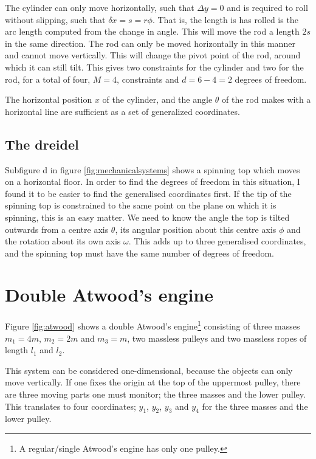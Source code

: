 \documentclass[11pt]{amsart}
\newcommand{\nocontentsline}[3]{}
\newcommand{\tocless}[2]{\bgroup\let\addcontentsline=\nocontentsline#1{#2}\egroup}
\begin{document}
The cylinder can only move horizontally, such that $\Delta y=0$ and is required to roll without slipping, such that $\delta x = s = r\phi$. That is, the length is has rolled is the arc length computed from the change in angle. This will move the rod a length $2s$ in the same direction. The rod can only be moved horizontally in this manner and cannot move vertically. This will change the pivot point of the rod, around which it can still tilt. This gives two constraints for the cylinder and two for the rod, for a total of four, $M=4$, constraints and $d = 6-4=2$ degrees of freedom.

The horizontal position $x$ of the cylinder, and the angle $\theta$ of the rod makes with a horizontal line are sufficient as a set of generalized coordinates.

\tocless\subsection{The dreidel}
Subfigure d in figure \ref{fig:mechanicalsystems} shows a spinning top which moves on a horizontal floor. In order to find the degrees of freedom in this situation, I found it to be easier to find the generalised coordinates first. If the tip of the spinning top is constrained to the same point on the plane on which it is spinning, this is an easy matter. We need to know the angle the top is tilted outwards from a centre axis $\theta$, its angular position about this centre axis $\phi$ and the rotation about its own axis $\omega$. This adds up to three generalised coordinates, and the spinning top must have the same number of degrees of freedom.

\section{Double Atwood's engine}

Figure \ref{fig:atwood} shows a double Atwood's engine\footnote{A regular/single Atwood's engine has only one pulley.} consisting of three masses $m_1 = 4m$, $m_2=2m$ and $m_3=m$, two massless pulleys and two massless ropes of length $l_1$ and $l_2$.

This system can be considered one-dimensional, because the objects can only move vertically. If one fixes the origin at the top of the uppermost pulley, there are three moving parts one must monitor; the three masses and the lower pulley. This translates to four coordinates; $y_1$, $y_2$, $y_3$ and $y_4$ for the three masses and the lower pulley.
\end{document}
